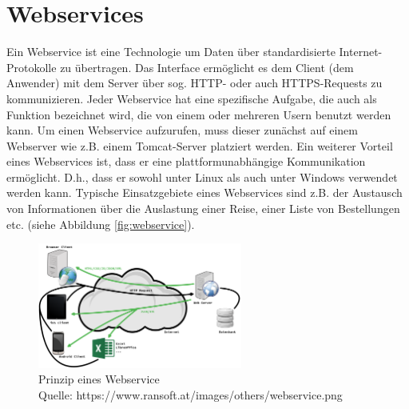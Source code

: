 \section{Webservices}
\label{sec:Webservices}
Ein Webservice ist eine Technologie um Daten über standardisierte Internet-Protokolle zu übertragen. Das Interface ermöglicht es dem Client (dem Anwender) mit dem Server über sog. HTTP- oder auch HTTPS-Requests zu kommunizieren. Jeder Webservice hat eine spezifische Aufgabe, die auch als Funktion bezeichnet wird, die von einem oder mehreren Usern benutzt werden kann. Um einen Webservice aufzurufen, muss dieser zunächst auf einem Webserver wie z.B. einem Tomcat-Server platziert werden. Ein weiterer Vorteil eines Webservices ist, dass er eine plattformunabhängige Kommunikation ermöglicht. D.h., dass er sowohl unter Linux als auch unter Windows verwendet werden kann. Typische Einsatzgebiete eines Webservices sind z.B. der Austausch von Informationen über die Auslastung einer Reise, einer Liste von Bestellungen etc. (siehe Abbildung \vref{fig:webservice}).

\begin{figure}[h]
	\centering 
	\includegraphics[width=0.6\textwidth]{img/webservice.png}
	\captionsetup{format=hang}
	\caption[Prinzip eines Webservice]{\label{fig:webservice}Prinzip eines Webservice \\Quelle: https://www.ransoft.at/images/others/webservice.png}
\end{figure}